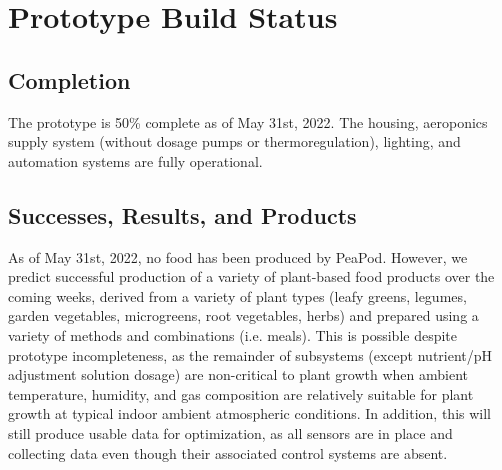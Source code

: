 \documentclass{../tex/report}
\begin{document}
\clearpage



\clearpage



\clearpage



\clearpage



\clearpage



\clearpage



\clearpage


% 

\section{Prototype Build Status}

\subsection{Completion}
The prototype is 50\% complete as of May 31st, 2022. The housing, aeroponics supply system (without dosage pumps or thermoregulation), lighting, and automation systems are fully operational.


\subsection{Successes, Results, and Products}

As of May 31st, 2022, no food has been produced by PeaPod. However, we predict successful production of a variety of plant-based food products over the coming weeks, derived from a variety of plant types (leafy greens, legumes, garden vegetables, microgreens, root vegetables, herbs) and prepared using a variety of methods and combinations (i.e. meals). This is possible despite prototype incompleteness, as the remainder of subsystems (except nutrient/pH adjustment solution dosage) are non-critical to plant growth when ambient temperature, humidity, and gas composition are relatively suitable for plant growth at typical indoor ambient atmospheric conditions. In addition, this will still produce usable data for optimization, as all sensors are in place and collecting data even though their associated control systems are absent.
\end{document}
